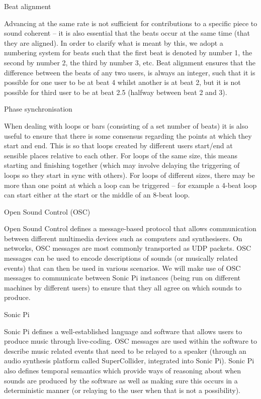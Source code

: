 \documentclass[12pt,a4paper,twoside]{article}
\begin{document}
\large
Beat alignment

\normalsize
Advancing at the same rate is not sufficient for contributions to a specific piece to sound coherent -- it is also essential that the beats occur at the same time (that they are aligned). In order to clarify what is meant by this, we adopt a numbering system for beats such that the first beat is denoted by number 1, the second by number 2, the third by number 3, etc. Beat alignment ensures that the difference between the beats of any two users, is always an integer, such that it is possible for one user to be at beat 4 whilst another is at beat 2, but it is not possible for third user to be at beat 2.5 (halfway between beat 2 and 3).

\large
Phase synchronisation

\normalsize
When dealing with loops or bars (consisting of a set number of beats) it is also useful to ensure that there is some consensus regarding the points at which they start and end. This is so that loops created by different users start/end at sensible places relative to each other. For loops of the same size, this means starting and finishing together (which may involve delaying the triggering of loops so they start in sync with others). For loops of different sizes, there may be more than one point at which a loop can be triggered -- for example a 4-beat loop can start either at the start or the middle of an 8-beat loop.

\Large
Open Sound Control (OSC)

\normalsize
Open Sound Control defines a message-based protocol that allows communication between different multimedia devices such as computers and synthesisers. On networks, OSC messages are most commonly transported as UDP packets. OSC messages can be used to encode descriptions of sounds (or musically related events) that can then be used in various scenarios. We will make use of OSC messages to communicate between Sonic Pi instances (being run on different machines by different users) to ensure that they all agree on which sounds to produce.

\Large
Sonic Pi

\normalsize
Sonic Pi defines a well-established language and software that allows users to produce music through live-coding. OSC messages are used within the software to describe music related events that need to be relayed to a speaker (through an audio synthesis platform called SuperCollider, integrated into Sonic Pi). Sonic Pi also defines temporal semantics which provide ways of reasoning about when sounds are produced by the software as well as making sure this occurs in a deterministic manner (or relaying to the user when that is not a possibility).
\end{document}
